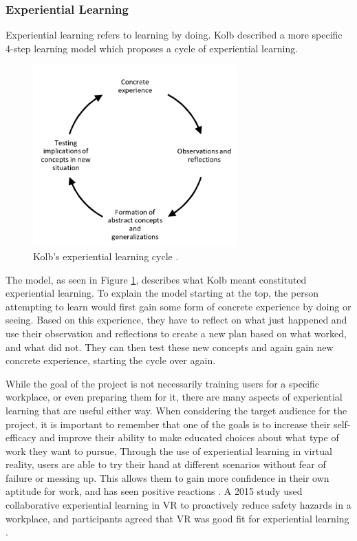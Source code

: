 \subsubsection{Experiential Learning}
\label{sec:experientialLearning}
Experiential learning refers to learning by doing. Kolb described a more specific 4-step learning model which proposes a cycle of experiential learning\cite{kolb1974toward}. 

\begin{figure}
    \centering
    \includegraphics[width=0.7\textwidth]{./fig/background/kolbModel.png}
    \caption{Kolb's experiential learning cycle \cite{kolbModel}.}
    \label{fig:KolbModel}
\end{figure}

The model, as seen in Figure \ref{fig:KolbModel}, describes what Kolb meant constituted experiential learning. To explain the model starting at the top, the person attempting to learn would first gain some form of concrete experience by doing or seeing. Based on this experience, they have to reflect on what just happened and use their observation and reflections to create a new plan based on what worked, and what did not. They can then test these new concepts and again gain new concrete experience, starting the cycle over again.

While the goal of the project is not necessarily training users for a specific workplace, or even preparing them for it, there are many aspects of experiential learning that are useful either way. When considering the target audience for the project, it is important to remember that one of the goals is to increase their self-efficacy and improve their ability to make educated choices about what type of work they want to pursue, Through the use of experiential learning in virtual reality, users are able to try their hand at different scenarios without fear of failure or messing up. This allows them to gain more confidence in their own aptitude for work, and has seen positive reactions \cite{fominykh2019immersive} \cite{prasolova2019empowering}. A 2015 study used collaborative experiential learning in VR to proactively reduce safety hazards in a workplace, and participants agreed that VR was good fit for experiential learning \cite{le2015social}.

